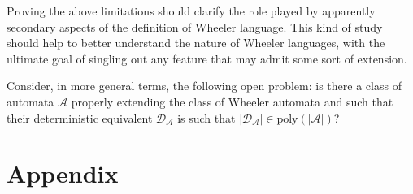 \documentclass[runningheads]{llncs}
\begin{document}
Proving the above limitations should clarify the role played by apparently secondary aspects of the definition of Wheeler language. This kind of study should help to better understand the nature of Wheeler languages, with the ultimate goal of singling out any feature that may admit some sort of extension. 

Consider, in more general terms, the following open problem: is there a class of   automata $\mathcal A$  properly extending the class of Wheeler automata and such that their  deterministic equivalent $\mathcal D_{\mathcal A}$ is such that  $|\mathcal D_{\mathcal A}| \in \text{poly}(|\mathcal A|)$?

\newpage
\section{Appendix}

\renewenvironment{proof}[1][\proofname]{{\bfseries #1.}}{\qed}
\end{document}
